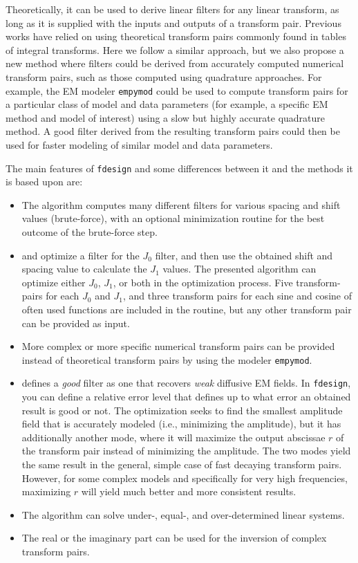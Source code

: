 \documentclass[paper,twocolumn,twoside]{geophysics}
\begin{document}
Theoretically, it can be used to derive linear filters for any linear
transform, as long as it is supplied with the inputs and outputs of a transform
pair. Previous works have relied on using theoretical transform pairs commonly
found in tables of integral transforms. Here we follow a similar approach, but
we also propose a new method where filters could be derived from accurately
computed numerical transform pairs, such as those computed using quadrature
approaches. For example, the EM modeler \texttt{empymod} could be used to
compute transform pairs for a particular class of model and data parameters
(for example, a specific EM method and model of interest) using a slow but
highly accurate quadrature method. A good filter derived from the resulting
transform pairs could then be used for faster modeling of similar model and
data parameters.

The main features of \texttt{fdesign} and some differences between it and the
methods it is based upon are:
\begin{itemize}
  \item The algorithm computes many different filters for various spacing and
    shift values (brute-force), with an optional minimization routine for
    the best outcome of the brute-force step.
  \item \cite{GP.07.Kong} and \cite{GEO.12.Key} optimize a filter for the $J_0$
    filter, and then use the obtained shift and spacing value to calculate the
    $J_1$ values. The presented algorithm can optimize either $J_0$, $J_1$, or
    both in the optimization process. Five transform-pairs for each $J_0$ and
    $J_1$, and three transform pairs for each sine and cosine of often used
    functions are included in the routine, but any other transform pair can be
    provided as input.
  \item More complex or more specific numerical transform  pairs  can be
    provided instead of theoretical transform pairs by using the modeler
    \texttt{empymod}.
  \item \cite{GP.07.Kong} defines a \emph{good} filter as one that recovers
    \emph{weak} diffusive EM fields. In  \texttt{fdesign}, you can define a
    relative error level that defines up to what error an obtained result is
    good or not. The optimization seeks to find the smallest amplitude field
    that is accurately modeled (i.e., minimizing the amplitude), but it has
    additionally another mode, where it will maximize the output abscissae $r$
    of the transform pair instead of minimizing the amplitude. The two modes
    yield the same result in the general, simple case of fast decaying
    transform pairs. However, for some complex models and specifically for very
    high frequencies, maximizing $r$ will yield much better and more consistent
    results.
  \item The algorithm can solve under-, equal-, and over-determined linear
    systems.
  \item The real or the imaginary part can be used for the inversion of complex
    transform pairs.
\end{itemize}
\end{document}
